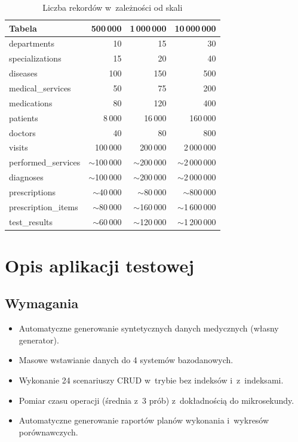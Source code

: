 \documentclass[12pt,a4paper]{article}
\begin{document}
\begin{table}[H]
\centering
\caption{Liczba rekordów w~zależności od skali}
\label{tab:scales}
\small
\begin{tabular}{@{}lrrr@{}}
\toprule
\textbf{Tabela} & \textbf{500\,000} & \textbf{1\,000\,000} & \textbf{10\,000\,000} \\
\midrule
departments & 10 & 15 & 30 \\
specializations & 15 & 20 & 40 \\
diseases & 100 & 150 & 500 \\
medical\_services & 50 & 75 & 200 \\
medications & 80 & 120 & 400 \\
patients & 8\,000 & 16\,000 & 160\,000 \\
doctors & 40 & 80 & 800 \\
visits & 100\,000 & 200\,000 & 2\,000\,000 \\
performed\_services & $\sim$100\,000 & $\sim$200\,000 & $\sim$2\,000\,000 \\
diagnoses & $\sim$100\,000 & $\sim$200\,000 & $\sim$2\,000\,000 \\
prescriptions & $\sim$40\,000 & $\sim$80\,000 & $\sim$800\,000 \\
prescription\_items & $\sim$80\,000 & $\sim$160\,000 & $\sim$1\,600\,000 \\
test\_results & $\sim$60\,000 & $\sim$120\,000 & $\sim$1\,200\,000 \\
\bottomrule
\end{tabular}
\end{table}


\section{Opis aplikacji testowej}

\subsection{Wymagania}
\begin{itemize}[noitemsep]
    \item Automatyczne generowanie syntetycznych danych medycznych (własny generator).
    \item Masowe wstawianie danych do 4 systemów bazodanowych.
    \item Wykonanie 24 scenariuszy CRUD w~trybie bez indeksów i~z~indeksami.
    \item Pomiar czasu operacji (średnia z~3 prób) z~dokładnością do mikrosekundy.
    \item Automatyczne generowanie raportów planów wykonania i~wykresów porównawczych.
\end{itemize}
\end{document}
